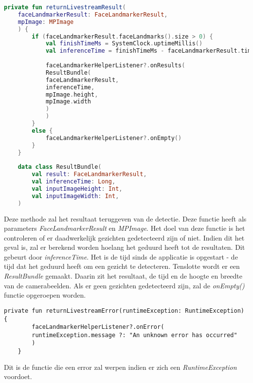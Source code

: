 \begin{lstlisting}[language=Kotlin, caption=returnLiveStreamResult in FaceLandmarkerHelper.kt]
    private fun returnLivestreamResult(
    faceLandmarkerResult: FaceLandmarkerResult,
    mpImage: MPImage
    ) {
        if (faceLandmarkerResult.faceLandmarks().size > 0) {
            val finishTimeMs = SystemClock.uptimeMillis()
            val inferenceTime = finishTimeMs - faceLandmarkerResult.timestampMs()
            
            faceLandmarkerHelperListener?.onResults(
            ResultBundle(
            faceLandmarkerResult,
            inferenceTime,
            mpImage.height,
            mpImage.width
            )
            )
        }
        else {
            faceLandmarkerHelperListener?.onEmpty()
        }
    }
    
    data class ResultBundle(
        val result: FaceLandmarkerResult,
        val inferenceTime: Long,
        val inputImageHeight: Int,
        val inputImageWidth: Int,
    )
\end{lstlisting}
Deze methode zal het resultaat teruggeven van de detectie. Deze functie heeft als parameters \emph{FaceLandmarkerResult} en \emph{MPImage}. Het doel van deze functie is het controleren of er daadwerkelijk gezichten gedetecteerd zijn of niet. Indien dit het geval is, zal er berekend worden hoelang het geduurd heeft tot de resultaten. Dit gebeurt door \emph{inferenceTime}. Het is de tijd sinds de applicatie is opgestart - de tijd dat het geduurd heeft om een gezicht te detecteren. Tenslotte wordt er een \emph{ResultBundle} gemaakt. Daarin zit het resultaat, de tijd en de hoogte en breedte van de camerabeelden. Als er geen gezichten gedetecteerd zijn, zal de \emph{onEmpty()} functie opgeroepen worden.

\begin{lstlisting}[]
    private fun returnLivestreamError(runtimeException: RuntimeException) {
        faceLandmarkerHelperListener?.onError(
        runtimeException.message ?: "An unknown error has occurred"
        )
    }
\end{lstlisting}
Dit is de functie die een error zal werpen indien er zich een \emph{RuntimeException} voordoet.

